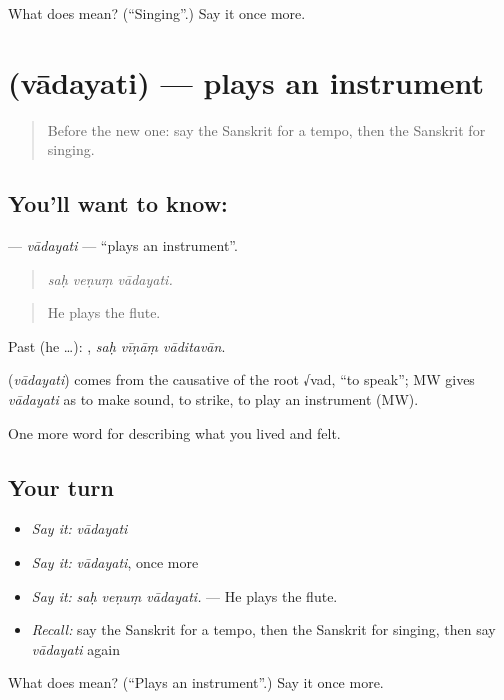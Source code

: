 \begin{tcolorbox}[breakable,colback=teal!4,colframe=teal!35!black,title={Before you move on}]
What does  mean? (\textquotedblleft{}Singing\textquotedblright{}.) Say it once more.
\end{tcolorbox}
\section[\texorpdfstring{\sk{वादयति} (vādayati)}{वादयति (vādayati)}]{ (vādayati) — plays an instrument}

\label{lesson:SA-C520-vadayati}



\begin{quote}
Before the new one: say the Sanskrit for a tempo, then the Sanskrit for singing.
\end{quote}

\subsection*{You'll want to know: }
\textbf{} — \emph{vādayati} — \textquotedblleft{}plays an instrument\textquotedblright{}.

\begin{quote}
  
\end{quote}

\begin{quote}
\emph{saḥ veṇuṃ vādayati.}
\end{quote}

\begin{quote}
He plays the flute.
\end{quote}

Past (he …):   , \emph{saḥ vīṇāṃ vāditavān}.

\begin{cousinweb}
\textbf{} (\emph{vādayati}) comes from the causative of the root √vad, \textquotedblleft{}to speak\textquotedblright{}; MW gives \emph{vādayati} as to make sound, to strike, to play an instrument (MW).
\end{cousinweb}

\begin{grammarlens}[title={What you've built}]
One more word for describing what you lived and felt.
\end{grammarlens}

\subsection*{Your turn}
\begin{itemize}
\raggedright
  \item \emph{Say it:} \emph{vādayati}
  \item \emph{Say it:} \emph{vādayati}, once more
  \item \emph{Say it:} \emph{saḥ veṇuṃ vādayati.} — He plays the flute.
  \item \emph{Recall:} say the Sanskrit for a tempo, then the Sanskrit for singing, then say \emph{vādayati} again
\end{itemize}

\begin{tcolorbox}[breakable,colback=teal!4,colframe=teal!35!black,title={Before you move on}]
What does  mean? (\textquotedblleft{}Plays an instrument\textquotedblright{}.) Say it once more.
\end{tcolorbox}
